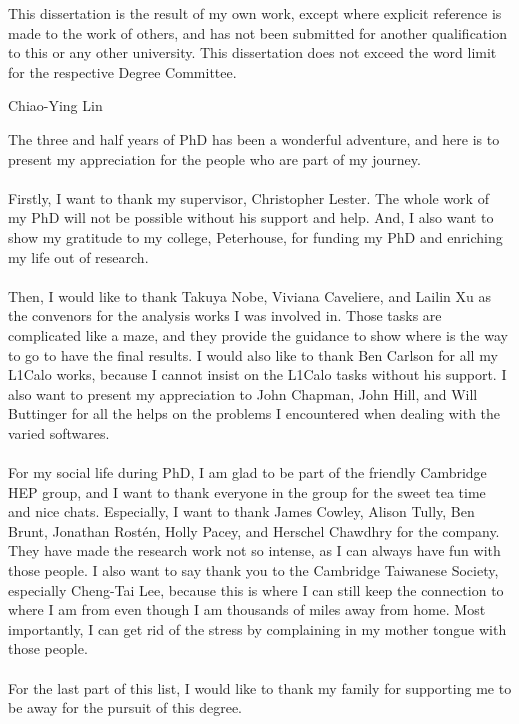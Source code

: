 \begin{declaration}
  This dissertation is the result of my own work, except where explicit
reference is made to the work of others, and has not been submitted
for another qualification to this or any other university. This
dissertation does not exceed the word limit for the respective Degree
Committee.
  \vspace*{1cm}
  \begin{flushright}
    Chiao-Ying Lin
  \end{flushright}
\end{declaration}


\begin{acknowledgements}
\noindent
The three and half years of PhD has been a wonderful adventure, and here is to present my appreciation for the people who are part of my journey.
\\
\\Firstly, I want to thank my supervisor, Christopher Lester. The whole work of my PhD will not be possible without his support and help. And, I also want to show my gratitude to my college, Peterhouse, for funding my PhD and enriching my life out of research. 
\\
\\Then, I would like to thank Takuya Nobe, Viviana Caveliere, and Lailin Xu as the convenors for the analysis works I was involved in. Those tasks are complicated like a maze, and they provide the guidance to show where is the way to go to have the final results. I would also like to thank Ben Carlson for all my L1Calo works, because I cannot insist on the L1Calo tasks without his support.  I also want to present my appreciation to John Chapman, John Hill, and Will Buttinger for all the helps on the problems I encountered when dealing with the varied softwares.
\\
\\For my social life during PhD, I am glad to be part of the friendly Cambridge HEP group, and I want to thank everyone in the group for the sweet tea time and nice chats. Especially, I want to thank James Cowley, Alison Tully, Ben Brunt, Jonathan Rostén, Holly Pacey, and Herschel Chawdhry for the company. They have made the research work not so intense, as I can always have fun with those people. I also want to say thank you to the Cambridge Taiwanese Society, especially Cheng-Tai Lee, because this is where I can still keep the connection to where I am from even though I am thousands of miles away from home. Most importantly, I can get rid of the stress by complaining in my mother tongue with those people.
\\
\\For the last part of this list, I would like to thank my family for supporting me to be away for the pursuit of this degree. 

\end{acknowledgements}



